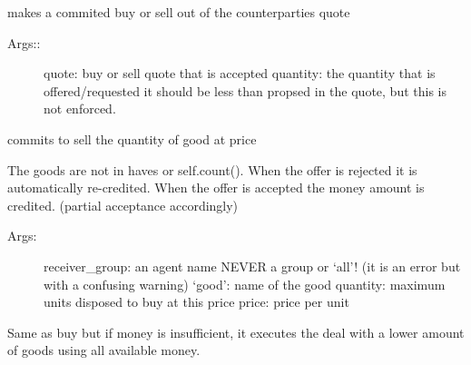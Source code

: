\documentclass[letterpaper,10pt,english]{sphinxmanual}
\begin{document}
\begin{fulllineitems}

\begin{fulllineitems}
\label{Trade:abce.Trade.accept_quote_partial}
makes a commited buy or sell out of the counterparties quote
\begin{description}
\item[{Args::}] \leavevmode
quote: buy or sell quote that is accepted
quantity: the quantity that is offered/requested
it should be less than propsed in the quote, but this is not enforced.

\end{description}

\end{fulllineitems}


\begin{fulllineitems}
\label{Trade:abce.Trade.buy}
commits to sell the quantity of good at price

The goods are not in haves or self.count(). When the offer is
rejected it is automatically re-credited. When the offer is
accepted the money amount is credited. (partial acceptance
accordingly)
\begin{description}
\item[{Args:}] \leavevmode
receiver\_group: an agent name  NEVER a group or `all'!
(it is an error but with a confusing warning)
`good': name of the good
quantity: maximum units disposed to buy at this price
price: price per unit

\end{description}

\end{fulllineitems}


\begin{fulllineitems}
\label{Trade:abce.Trade.buy_max_possible}
Same as buy but if money is insufficient, it executes the deal with
a lower amount of goods using all available money.

\end{fulllineitems}


\end{fulllineitems}
\end{document}
